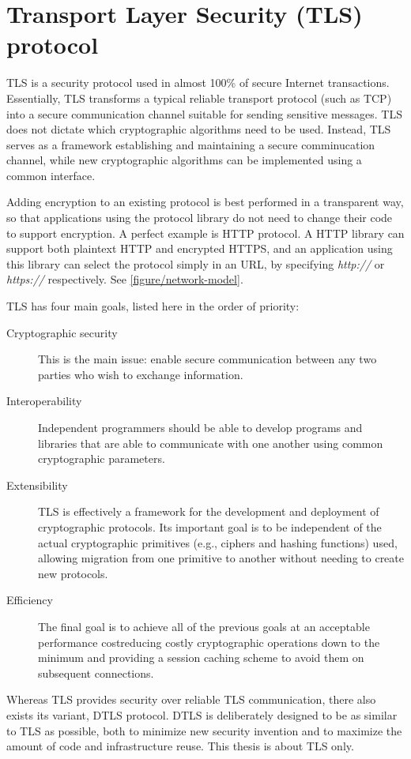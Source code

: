 \chapter{Transport Layer Security (TLS) protocol}



TLS is a security protocol used in almost 100\% of secure Internet transactions. Essentially, TLS transforms a typical reliable transport protocol (such as TCP) into a secure communication channel suitable for sending sensitive messages. TLS does not dictate which cryptographic algorithms need to be used. Instead, TLS serves as a framework establishing and maintaining a secure comminucation channel, while new cryptographic algorithms can be implemented using a common interface.

Adding encryption to an existing protocol is best performed in a transparent way, so that applications using the protocol library do not need to change their code to support encryption. A perfect example is HTTP protocol. A HTTP library can support both plaintext HTTP and encrypted HTTPS, and an application using this library can select the protocol simply in an URL, by specifying \textit{http://} or \textit{https://} respectively. See \autoref{figure/network-model}.

TLS has four main goals, listed here in the order of priority:

\begin{description}
  \item[Cryptographic security] This is the main issue: enable secure communication between any two parties who wish to exchange information.
  \item[Interoperability] Independent programmers should be able to develop programs and libraries that are able to communicate with one another using common cryptographic parameters.
  \item[Extensibility] TLS is effectively a framework for the development and deployment of cryptographic protocols. Its important goal is to be independent of the actual cryptographic primitives (e.g., ciphers and hashing functions) used, allowing migration from one primitive to another without needing to create new protocols.
  \item[Efficiency] The final goal is to achieve all of the previous goals at an acceptable performance costreducing costly cryptographic operations down to the minimum and providing a session caching scheme to avoid them on subsequent connections. \cite{ristic2014bulletproof}
\end{description}

Whereas TLS provides security over reliable TLS communication, there also exists its variant, DTLS protocol. DTLS is deliberately designed to be as similar to TLS as possible, both to minimize new security invention and to maximize the amount of code and infrastructure reuse. \cite{rfc6347} This thesis is about TLS only.





